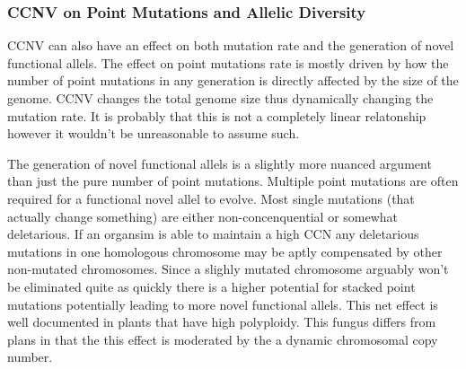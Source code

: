 \documentclass{article}
\begin{document}
    \subsubsection{CCNV on Point Mutations and Allelic Diversity}
    CCNV can also have an effect on both mutation rate and the generation of novel functional allels.  The effect on point mutations rate is mostly driven by how the number of point mutations in any generation is directly affected by the size of the genome.  CCNV changes the total genome size thus dynamically changing the mutation rate.  It is probably that this is not a completely linear relatonship however it wouldn't be unreasonable to assume such.
    
    The generation of novel functional allels is a slightly more nuanced argument than just the pure number of point mutations.  Multiple point mutations are often required for a functional novel allel to evolve.  Most single mutations (that actually change something) are either non-concenquential or somewhat deletarious.  If an organsim is able to maintain a high CCN any deletarious mutations in one homologous chromosome may be aptly compensated by other non-mutated chromosomes.  Since a slighly mutated chromosome arguably won't be eliminated quite as quickly there is a higher potential for stacked point mutations potentially leading to more novel functional allels.  This net effect is well documented in plants that have high polyploidy.  This fungus differs from plans in that the this effect is moderated by the a dynamic chromosomal copy number.
\end{document}
